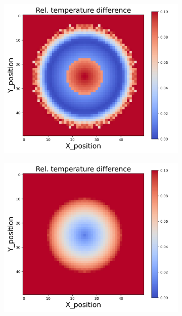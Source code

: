 {\begin{figure}[h]
\begin{minipage}{\textwidth}
\begin{subfigure}{0.27\textwidth}
        \end{subfigure}
    \end{minipage}\\
    \begin{minipage}{\textwidth}
        \centering
        \begin{subfigure}{0.27\textwidth}
            \centering
            \includegraphics[width=\textwidth]{figures/raw_data/25/mix/T_bias.jpg}
        \end{subfigure}
        \begin{subfigure}{0.27\textwidth}
            \centering
            \includegraphics[width=\textwidth]{figures/raw_data/26/mix/T_bias.jpg}

\end{subfigure}
\end{minipage}
\end{figure}}
